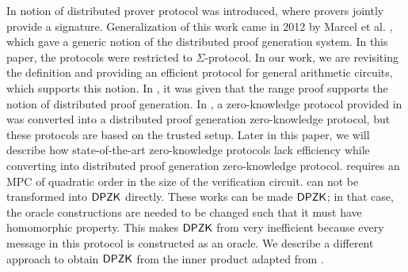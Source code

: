 In \cite{DDS} notion of distributed prover protocol was introduced, where provers jointly provide a signature. Generalization of this work came in 2012 by Marcel et al. \cite{EfficientTZ}, which gave a generic notion of the distributed proof generation system. In this paper, the protocols were restricted to $\Sigma$-protocol.
In our work, we are revisiting the definition and providing an efficient protocol for general arithmetic circuits, which supports this notion. In \cite{Bulletproofs}, it was given that the range proof supports the notion of distributed proof generation. In \cite{Trinocchio}, a zero-knowledge protocol provided in \cite{pinnochio_PHGR} was converted into a distributed proof generation zero-knowledge protocol, but these protocols are based on the trusted setup. Later in this paper, we will describe how state-of-the-art zero-knowledge protocols lack efficiency while converting into distributed proof generation zero-knowledge protocol. \cite{spartan} requires an MPC of quadratic order in the size of the verification circuit. \cite{ligero, Aurora} can not be transformed into $\mathsf{DPZK}$ directly. These works can be made $\mathsf{DPZK}$; in that case, the oracle constructions are needed to be changed such that it must have homomorphic property. This makes $\mathsf{DPZK}$ from \cite{Aurora} very inefficient because every message in this protocol is constructed as an oracle. We describe a different approach to obtain $\mathsf{DPZK}$ from the inner product adapted from \cite{Bulletproofs}.
